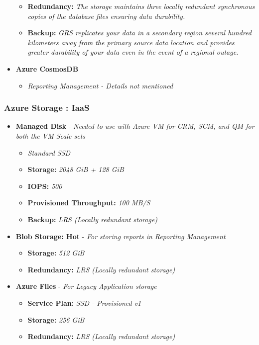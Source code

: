 \documentclass{llncs}
\begin{document}
\begin{itemize}
\begin{itemize}
              \item  \textbf{Redundancy:} \textit{The storage maintains three locally redundant synchronous copies of the database files ensuring data durability.}
              \item  \textbf{Backup:} \textit{GRS replicates your data in a secondary region several hundred kilometers away from the primary source data location and provides greater durability of your data even in the event of a regional outage.}
          \end{itemize}
    \item \textbf{Azure CosmosDB}
          \begin{itemize}
              \item \textit{Reporting Management - Details not mentioned}

          \end{itemize}
\end{itemize}

\subsubsection{Azure Storage : IaaS} \leavevmode\newline
\begin{itemize}
    \item \textbf{Managed Disk} - \textit{Needed to use with Azure VM for CRM, SCM, and QM for both the VM Scale sets}
         \begin{itemize}
              \item \textit{Standard SSD}
              \item  \textbf{Storage:} \textit{2048 GiB + 128 GiB}
              \item  \textbf{IOPS:} \textit{500}
              \item  \textbf{Provisioned Throughput:} \textit{100 MB/S}
              \item  \textbf{Backup:} \textit{LRS (Locally redundant storage)}
          \end{itemize}
    \item \textbf{Blob Storage: Hot} - \textit{For storing reports in Reporting Management}
         \begin{itemize}
              \item  \textbf{Storage:} \textit{512 GiB}
              \item  \textbf{Redundancy:} \textit{LRS (Locally redundant storage)}
          \end{itemize}
    \item \textbf{Azure Files} - \textit{For Legacy Application storage}
         \begin{itemize}
              \item  \textbf{Service Plan:} \textit{SSD - Provisioned v1}
              \item  \textbf{Storage:} \textit{256 GiB}
              \item  \textbf{Redundancy:} \textit{LRS (Locally redundant storage)}
          \end{itemize}
\end{itemize}
\end{document}
